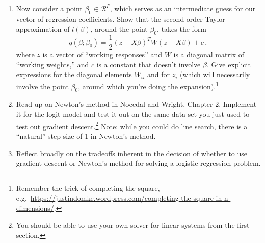 \documentclass{article}
\begin{document}
\begin{enumerate}
\item Now consider a point $\beta_0 \in \mathcal{R}^P$, which serves as an intermediate guess for our vector of regression coefficients.  Show that the second-order Taylor approximation of $l(\beta)$, around the point $\beta_0$, takes the form
$$
q(\beta; \beta_0) = \frac{1}{2}(z - X \beta)^T W (z - X \beta) + c\, ,
$$
where $z$ is a vector of ``working responses'' and $W$ is a diagonal matrix of ``working weights,'' and $c$ is a constant that doesn't involve $\beta$.  Give explicit expressions for the diagonal elements $W_{ii}$ and for $z_i$ (which will necessarily involve the point $\beta_0$, around which you're doing the expansion).\footnote{Remember the trick of completing the square, e.g.~\url{https://justindomke.wordpress.com/completing-the-square-in-n-dimensions/}.}

\item Read up on Newton's method in Nocedal and Wright, Chapter 2.  Implement it for the logit model and test it out on the same data set you just used to test out gradient descent.\footnote{You should be able to use your own solver for linear systems from the first section.}  Note: while you could do line search, there is a ``natural'' step size of 1 in Newton's method.

\item Reflect broadly on the tradeoffs inherent in the decision of whether to use gradient descent or Newton's method for solving a logistic-regression problem.




\end{enumerate}
\end{document}
